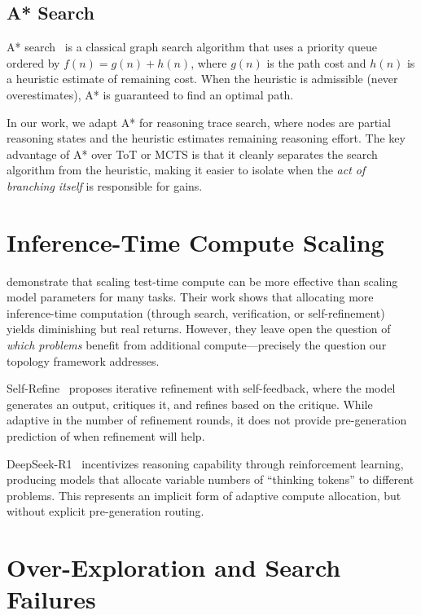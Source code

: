 \subsection{A* Search}

A* search~\citep{hart1968formal} is a classical graph search algorithm that uses a priority queue ordered by $f(n) = g(n) + h(n)$, where $g(n)$ is the path cost and $h(n)$ is a heuristic estimate of remaining cost. When the heuristic is admissible (never overestimates), A* is guaranteed to find an optimal path.

In our work, we adapt A* for reasoning trace search, where nodes are partial reasoning states and the heuristic estimates remaining reasoning effort. The key advantage of A* over ToT or MCTS is that it cleanly separates the search algorithm from the heuristic, making it easier to isolate when the \emph{act of branching itself} is responsible for gains.

\section{Inference-Time Compute Scaling}

\cite{snell2024scaling} demonstrate that scaling test-time compute can be more effective than scaling model parameters for many tasks. Their work shows that allocating more inference-time computation (through search, verification, or self-refinement) yields diminishing but real returns. However, they leave open the question of \emph{which problems} benefit from additional compute---precisely the question our topology framework addresses.

Self-Refine~\citep{madaan2023selfrefine} proposes iterative refinement with self-feedback, where the model generates an output, critiques it, and refines based on the critique. While adaptive in the number of refinement rounds, it does not provide pre-generation prediction of when refinement will help.

DeepSeek-R1~\citep{deepseekr1} incentivizes reasoning capability through reinforcement learning, producing models that allocate variable numbers of ``thinking tokens'' to different problems. This represents an implicit form of adaptive compute allocation, but without explicit pre-generation routing.

\section{Over-Exploration and Search Failures}

